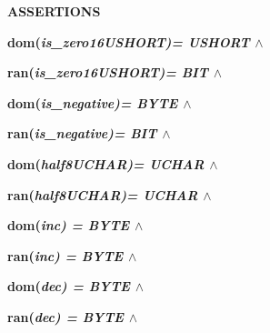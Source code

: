\documentclass[11pt]{article}
\begin{document}
\begin{sloppypar}
\hspace*{0.20in}

\hspace*{0.20in}

\bf ASSERTIONS

\hspace*{0.20in}

\hspace*{0.20in}  

\hspace*{0.20in}

\hspace*{0.20in}\bf dom\rm (\it is\_zero16USHORT\rm )\rm = \it USHORT  $\land$ 

\hspace*{0.20in}\bf ran\rm (\it is\_zero16USHORT\rm )\rm = \it BIT\hspace*{0.10in} $\land$ 

\hspace*{0.20in}

\hspace*{0.20in}\bf dom\rm (\it is\_negative\rm )\rm = \it BYTE  $\land$ 

\hspace*{0.20in}\bf ran\rm (\it is\_negative\rm )\rm = \it BIT\hspace*{0.10in} $\land$ 

\hspace*{0.20in}

\hspace*{0.20in}\bf dom\rm (\it half8UCHAR\rm )\rm = \it UCHAR  $\land$ 

\hspace*{0.20in}\bf ran\rm (\it half8UCHAR\rm )\rm = \it UCHAR  $\land$ 

\hspace*{0.20in}

\hspace*{0.20in}\bf dom\rm (\it inc\rm ) \rm = \it BYTE  $\land$ 

\hspace*{0.20in}\bf ran\rm (\it inc\rm ) \rm = \it BYTE  $\land$ 

\hspace*{0.20in}

\hspace*{0.20in}\bf dom\rm (\it dec\rm ) \rm = \it BYTE  $\land$ 

\hspace*{0.20in}\bf ran\rm (\it dec\rm ) \rm = \it BYTE  $\land$ 

\hspace*{0.20in}


\end{sloppypar}
\end{document}
